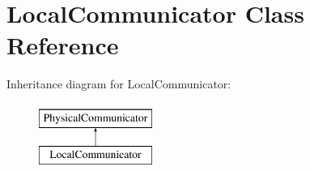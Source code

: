 \hypertarget{classLocalCommunicator}{}\section{Local\+Communicator Class Reference}
\label{classLocalCommunicator}
Inheritance diagram for Local\+Communicator\+:\begin{figure}[H]
\begin{center}
\leavevmode
\includegraphics[height=2.000000cm]{classLocalCommunicator}
\end{center}
\end{figure}
